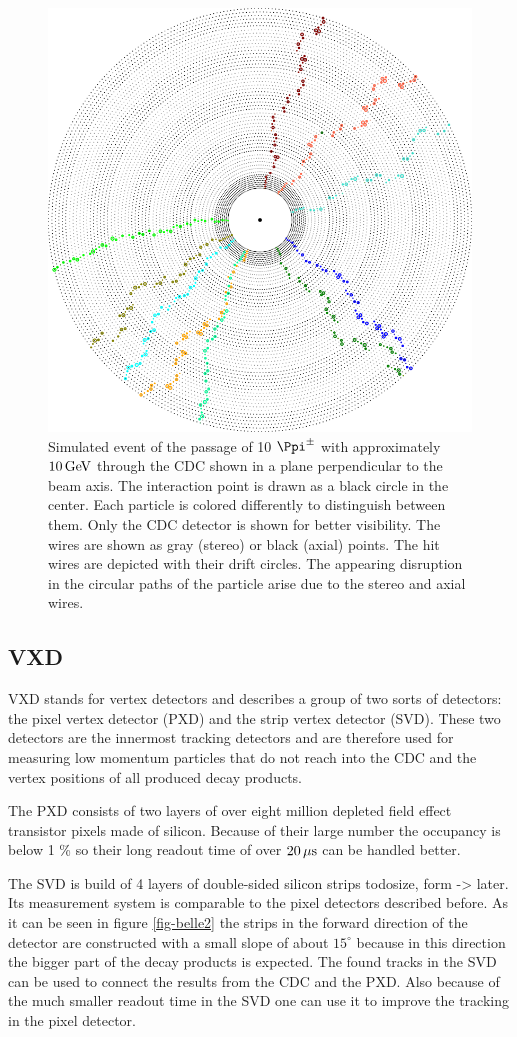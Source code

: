 \begin{figure}
  \centering
  \includegraphics[width=0.8\linewidth]{figures/experimental_setup/eventDisplayPionGun.png}
  \caption{Simulated event of the passage of 10 $\Ppi^\pm$ with approximately $\unit[10]{GeV}$ through the CDC shown in a plane perpendicular to the beam axis. The interaction point is drawn as a black circle in the center. Each particle is colored differently to distinguish between them. Only the CDC detector is shown for better visibility. The wires are shown as gray (stereo) or black (axial) points. The hit wires are depicted with their drift circles. The appearing disruption in the circular paths of the particle arise due to the stereo and axial wires.}
  \label{fig-event-display}
\end{figure}

\clearpage
\subsection{VXD}
VXD stands for vertex detectors and describes a group of two sorts of detectors: the pixel vertex detector (PXD) and the strip vertex detector (SVD). These two detectors are the innermost tracking detectors and are therefore used for measuring low momentum particles that do not reach into the CDC and the vertex positions of all produced decay products. 

The PXD consists of two layers of over eight million depleted field effect transistor pixels made of silicon. Because of their large number the occupancy is below 1 \% so their long readout time of over $\unit[20]{\mu s}$ can be handled better.  

The SVD is build of 4 layers of double-sided silicon strips todo{size, form -> later}. Its measurement system is comparable to the pixel detectors described before. As it can be seen in figure \ref{fig-belle2} the strips in the forward direction of the detector are constructed with a small slope of about $15^\circ$ because in this direction the bigger part of the decay products is expected. The found tracks in the SVD can be used to connect the results from the CDC and the PXD. Also because of the much smaller readout time in the SVD one can use it to improve the tracking in the pixel detector. 
